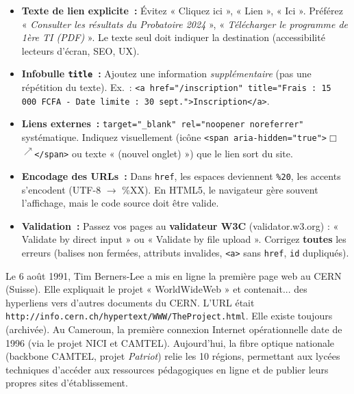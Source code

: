 \documentclass[11pt]{article}
\begin{document}
\begin{aretenir}
\begin{itemize}
    \item \textbf{Texte de lien explicite~:} Évitez « Cliquez ici », « Lien », « Ici ». Préférez « \emph{Consulter les résultats du Probatoire 2024} », « \emph{Télécharger le programme de 1ère TI (PDF)} ». Le texte seul doit indiquer la destination (accessibilité lecteurs d'écran, SEO, UX).
    \item \textbf{Infobulle \texttt{title}~:} Ajoutez une information \emph{supplémentaire} (pas une répétition du texte). Ex.~: \texttt{<a href="/inscription" title="Frais : 15\,000 FCFA - Date limite : 30 sept.">Inscription</a>}.
    \item \textbf{Liens externes~:} \texttt{target="\_blank" rel="noopener noreferrer"} systématique. Indiquez visuellement (icône \texttt{<span aria-hidden="true">$\Box$\textsuperscript{$\nearrow$}</span>} ou texte « (nouvel onglet) ») que le lien sort du site.
    \item \textbf{Encodage des URLs~:} Dans \texttt{href}, les espaces deviennent \texttt{\%20}, les accents s'encodent (UTF-8 $\to$ \%XX). En HTML5, le navigateur gère souvent l'affichage, mais le code source doit être valide.
    \item \textbf{Validation~:} Passez vos pages au \textbf{validateur W3C} (validator.w3.org) : « Validate by direct input » ou « Validate by file upload ». Corrigez \textbf{toutes} les erreurs (balises non fermées, attributs invalides, \texttt{<a>} sans \texttt{href}, \texttt{id} dupliqués).
\end{itemize}
\end{aretenir}

\begin{savaistu}
Le 6 août 1991, Tim Berners-Lee a mis en ligne la première page web au CERN (Suisse). Elle expliquait le projet « WorldWideWeb » et contenait... des hyperliens vers d'autres documents du CERN. L'URL était \texttt{http://info.cern.ch/hypertext/WWW/TheProject.html}. Elle existe toujours (archivée). Au Cameroun, la première connexion Internet opérationnelle date de 1996 (via le projet NICI et CAMTEL). Aujourd'hui, la fibre optique nationale (backbone CAMTEL, projet \emph{Patriot}) relie les 10 régions, permettant aux lycées techniques d'accéder aux ressources pédagogiques en ligne et de publier leurs propres sites d'établissement.
\end{savaistu}
\end{document}
